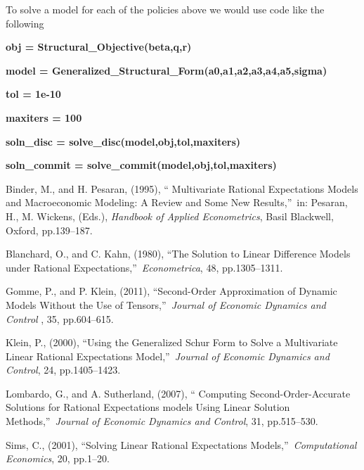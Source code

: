 \documentclass[thmsa,notitlepage,11pt]{article}
\begin{document}
To solve a model for each of the policies above we would use code like the
following

\bigskip 

\textbf{obj = Structural\_Objective(beta,q,r)}

\textbf{model = Generalized\_Structural\_Form(a0,a1,a2,a3,a4,a5,sigma)}

\textbf{tol = 1e-10}

\textbf{maxiters = 100}

\textbf{soln\_disc = solve\_disc(model,obj,tol,maxiters)}

\textbf{soln\_commit = solve\_commit(model,obj,tol,maxiters)}

\bigskip 

\setlength{\baselineskip}{10pt}

\begin{thebibliography}{9}
\bibitem{} Binder, M., and H. Pesaran, (1995), \textquotedblleft
Multivariate Rational Expectations Models and Macroeconomic Modeling: A
Review and Some New Results,\textquotedblright\ in: Pesaran, H., M. Wickens,
(Eds.), \textit{Handbook of Applied Econometrics}, Basil Blackwell, Oxford,
pp.139--187.

\bibitem{} Blanchard, O., and C. Kahn, (1980), \textquotedblleft The
Solution to Linear Difference Models under Rational
Expectations,\textquotedblright\ \textit{Econometrica}, 48, pp.1305--1311.

\bibitem{} Gomme, P., and P. Klein, (2011), \textquotedblleft Second-Order
Approximation of Dynamic Models Without the Use of
Tensors,\textquotedblright\ \textit{Journal of Economic Dynamics and Control}%
, 35, pp.604--615.

\bibitem{} Klein, P., (2000), \textquotedblleft Using the Generalized Schur
Form to Solve a Multivariate Linear Rational Expectations
Model,\textquotedblright\ \textit{Journal of Economic Dynamics and Control},
24, pp.1405--1423.

\bibitem{} Lombardo, G., and A. Sutherland, (2007), \textquotedblleft
Computing Second-Order-Accurate Solutions for Rational Expectations models
Using Linear Solution Methods,\textquotedblright\ \textit{Journal of
Economic Dynamics and Control}, 31, pp.515--530.

\bibitem{} Sims, C., (2001), \textquotedblleft Solving Linear Rational
Expectations Models,\textquotedblright\ \textit{Computational Economics},
20, pp.1--20.
\end{thebibliography}
\end{document}
